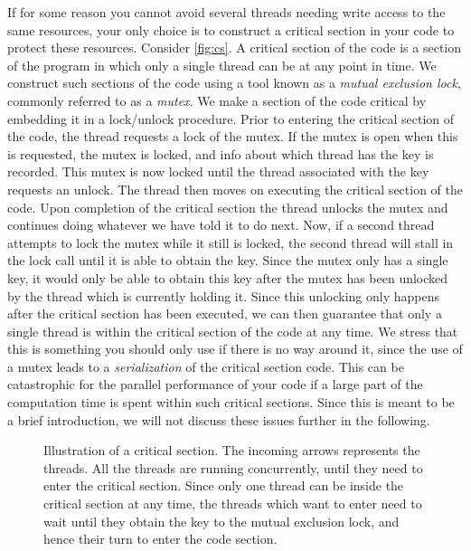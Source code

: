 If for some reason you cannot avoid several threads needing write access to the
same resources, your only choice is to construct a critical section in your code
to protect these resources. Consider \autoref{fig:cs}. A critical section of the
code is a section of the program in which only a single thread can be at any
point in time. We construct such sections of the code using a tool known as a
\emph{mutual exclusion lock}, commonly referred to as a \emph{mutex}. We make a
section of the code critical by embedding it in a lock/unlock procedure. Prior
to entering the critical section of the code, the thread requests a lock of the
mutex. If the mutex is open when this is requested, the mutex is locked, and
info about which thread has the key is recorded. This mutex is now locked until
the thread associated with the key requests an unlock. The thread then moves on
executing the critical section of the code. Upon completion of the critical
section the thread unlocks the mutex and continues doing whatever we have told
it to do next. Now, if a second thread attempts to lock the mutex while it still
is locked, the second thread will stall in the lock call until it is able to
obtain the key. Since the mutex only has a single key, it would only be able to
obtain this key after the mutex has been unlocked by the thread which is
currently holding it. Since this unlocking only happens after the critical
section has been executed, we can then guarantee that only a single thread is
within the critical section of the code at any time. We stress that this is
something you should only use if there is no way around it, since the use of a
mutex leads to a \emph{serialization} of the critical section code. This can be
catastrophic for the parallel performance of your code if a large part of the
computation time is spent within such critical sections. Since this is meant to
be a brief introduction, we will not discuss these issues further in the
following.

\begin{figure}
  \centering
  \caption{
    Illustration of a critical section. The incoming arrows represents the
    threads. All the threads are running concurrently, until they need to enter
    the critical section. Since only one thread can be inside the critical
    section at any time, the threads which want to enter need to wait until they
    obtain the key to the mutual exclusion lock, and hence their turn to enter
    the code section.
  }
  \label{fig:cs}
\end{figure}

